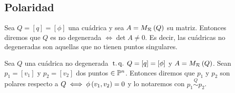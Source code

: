 \subsection{Polaridad}
\begin{defi}
  Sea $Q=[q]=[\phi]$ una cuádrica y sea $A=M_{\mathcal{R}}\left( Q\right)$ su matriz. Entonces diremos que $Q$ es no
  degenerada $\iff \det A \neq 0$. Es decir, las cuádricas no degeneradas son aquellas que no tienen
  puntos singulares.
\end{defi}

\begin{defi}
  Sea $Q$ una cuádrica no degenerada $\operatorname{\;t.q.\;} Q=[q]=[\phi]$ y $A=M_{\mathcal{R}}\left( Q\right)$. Sean $p_1=[v_1]$ y 
  $p_2=[v_2]$ dos puntos $\in \mathbb{P}^n$. Entonces diremos que $p_1$ y $p_2$ son polares respecto a $Q\iff
  \phi\left( v_1,v_2\right)=0$ y lo notaremos con $p_1 \stackrel{Q}{\sim} p_2$. 
\end{defi}

